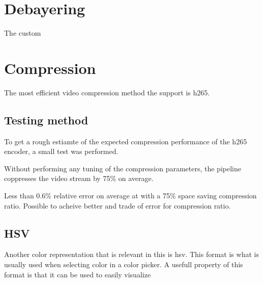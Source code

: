 \section{Debayering}
The custom



\section{Compression}



The most efficient video compression method the \jx support is \gls{h265}.

\subsection{Testing method}
To get a rough estiamte of the expected compression performance of the \gls{h265} encoder, a small test was performed.






Without performing any tuning of the compression parameters, the pipeline coppresses the video stream by 75\% on average.


Less than 0.6\% relative error on average at with a 75\% space saving compression ratio.
Possible to acheive better and trade of error for compression ratio.

\subsection{HSV}
Another color representation that is relevant in this \master is \gls{hsv}.
This format is what is usually used when selecting color in a color picker.
A usefull property of this format is that it can be used to easily visualize